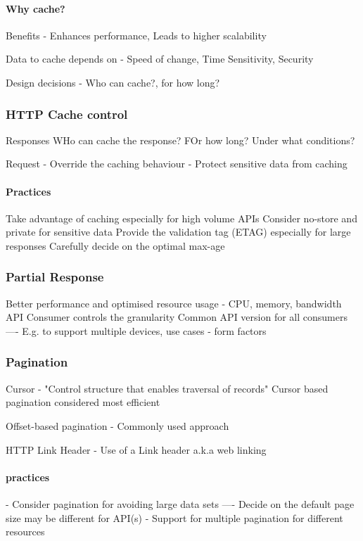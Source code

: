 \paragraph{Why cache?}
Benefits - Enhances performance, Leads to higher scalability

Data to cache depends on - Speed of change, Time Sensitivity, Security

Design decisions - Who can cache?, for how long?

\subsubsection{HTTP Cache control}
Responses
WHo can cache the response?
FOr how long?
Under what conditions?

Request
- Override the caching behaviour
- Protect sensitive data from caching

\paragraph{Practices}
Take advantage of caching especially for high volume APIs
Consider no-store and private for sensitive data
Provide the validation tag (ETAG) especially for large responses
Carefully decide on the optimal max-age

\subsubsection{Partial Response}
Better performance and optimised resource usage - CPU, memory, bandwidth
API Consumer controls the granularity
Common API version for all consumers
---- E.g. to support multiple devices, use cases - form factors

\subsubsection{Pagination}
Cursor - "Control structure that enables traversal of records"
Cursor based pagination considered most efficient

Offset-based pagination - Commonly used approach %

HTTP Link Header - Use of a Link header a.k.a web linking

\paragraph{practices}
- Consider pagination for avoiding large data sets
---- Decide on the default page size may be different for API(s)
- Support for multiple pagination for different resources

